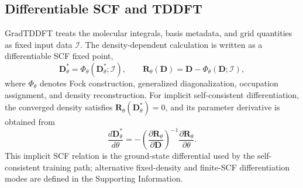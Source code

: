 \subsection{Differentiable SCF and TDDFT}
\label{sec:tddft}

GradTDDFT treats the molecular integrals, basis metadata, and grid
quantities as fixed input data $\mathcal{I}$. The density-dependent
calculation is written as a differentiable SCF fixed point,
\begin{equation}
  \mathbf{D}_\theta^\ast
  =
  \Phi_\theta(\mathbf{D}_\theta^\ast;\mathcal{I}),
  \qquad
  \mathbf{R}_\theta(\mathbf{D})
  =
  \mathbf{D}-\Phi_\theta(\mathbf{D};\mathcal{I}),
  \label{eq:scf-fixed-point-main}
\end{equation}
where $\Phi_\theta$ denotes Fock construction, generalized
diagonalization, occupation assignment, and density reconstruction.
For implicit self-consistent differentiation, the converged density
satisfies $\mathbf{R}_\theta(\mathbf{D}_\theta^\ast)=0$, and its
parameter derivative is obtained from
\begin{equation}
  \frac{d\mathbf{D}_\theta^\ast}{d\theta}
  =
  -
  \left(
    \frac{\partial\mathbf{R}_\theta}{\partial\mathbf{D}}
  \right)^{-1}
  \frac{\partial\mathbf{R}_\theta}{\partial\theta}.
  \label{eq:implicit-main}
\end{equation}
This implicit SCF relation is the ground-state differential used by
the self-consistent training path; alternative fixed-density and
finite-SCF differentiation modes are defined in the Supporting
Information.

